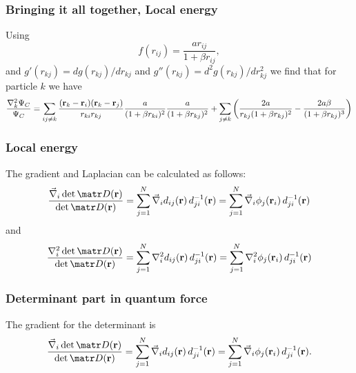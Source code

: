 \frame
{
  \frametitle{Bringing it all together, Local energy}
\begin{small}
{\scriptsize
Using 
\[
f(r_{ij})= \frac{ar_{ij}}{1+\beta r_{ij}},
\]
and $g'(r_{kj})=dg(r_{kj})/dr_{kj}$ and 
$g''(r_{kj})=d^2g(r_{kj})/dr_{kj}^2$  we find that for particle  $k$
we have
\[
  \frac{\nabla^2_k \Psi_C}{\Psi_C }=
\sum_{ij\ne k}\frac{({\bf r}_k-{\bf r}_i)({\bf r}_k-{\bf r}_j)}{r_{ki}r_{kj}}\frac{a}{(1+\beta r_{ki})^2}
\frac{a}{(1+\beta r_{kj})^2}+
\sum_{j\ne k}\left(\frac{2a}{r_{kj}(1+\beta r_{kj})^2}-\frac{2a\beta}{(1+\beta r_{kj})^3}\right)
\]
}
\end{small}
}

\frame
{
  \frametitle{Local energy}
\begin{small}
{\scriptsize
The gradient and
Laplacian can be calculated as follows:
\[
\frac{\vec\nabla_i\det{\matr D(\mathbf{r})}}
{\det{\matr D(\mathbf{r})}} =
\sum_{j=1}^N \vec\nabla_i d_{ij}(\mathbf{r})\,
d_{ji}^{-1}(\mathbf{r}) =
\sum_{j=1}^N \vec\nabla_i \phi_j(\mathbf{r}_i)\,
d_{ji}^{-1}(\mathbf{r})
\]
and
\[
\frac{\nabla^2_i\det{\matr D(\mathbf{r})}}
{\det{\matr D(\mathbf{r})}} =
\sum_{j=1}^N \nabla^2_i d_{ij}(\mathbf{r})\,
d_{ji}^{-1}(\mathbf{r}) =
\sum_{j=1}^N \nabla^2_i \phi_j(\mathbf{r}_i)\,
d_{ji}^{-1}(\mathbf{r})
\]
}
\end{small}
}



\frame
{
  \frametitle{Determinant part in quantum force}
\begin{small}
{\scriptsize
The gradient for the determinant is 
\[
\frac{\vec\nabla_i\det{\matr D(\mathbf{r})}}
{\det{\matr D(\mathbf{r})}} =
\sum_{j=1}^N \vec\nabla_i d_{ij}(\mathbf{r})\,
d_{ji}^{-1}(\mathbf{r}) =
\sum_{j=1}^N \vec\nabla_i \phi_j(\mathbf{r}_i)\,
d_{ji}^{-1}(\mathbf{r}).
\]
}
\end{small}
}


